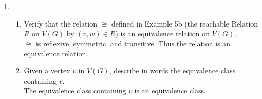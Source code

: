 \documentclass[11pt]{article}
\begin{document}
\begin{enumerate}
\begin{enumerate}
	\end{enumerate}
\setcounter{enumi}{16}
\item 
	\begin{enumerate}
	\item Verify that the relation $\cong$ defined in Example 5b (the reachable Relation $R$ on $V(G)$ by $(v,w)\in R$) is an 
	equivalence relation on $V(G)$.\\
	$\cong$ is reflexive, symmetric, and transitive. Thus the relation is an equivalence relation.
	\item Given a vertex $v$ in $V(G)$, describe in words the equivalence class containing $v$.\\
	The equivalence class containing $v$ is an equivalence class.
	\end{enumerate}
\end{enumerate}

\end{document}
